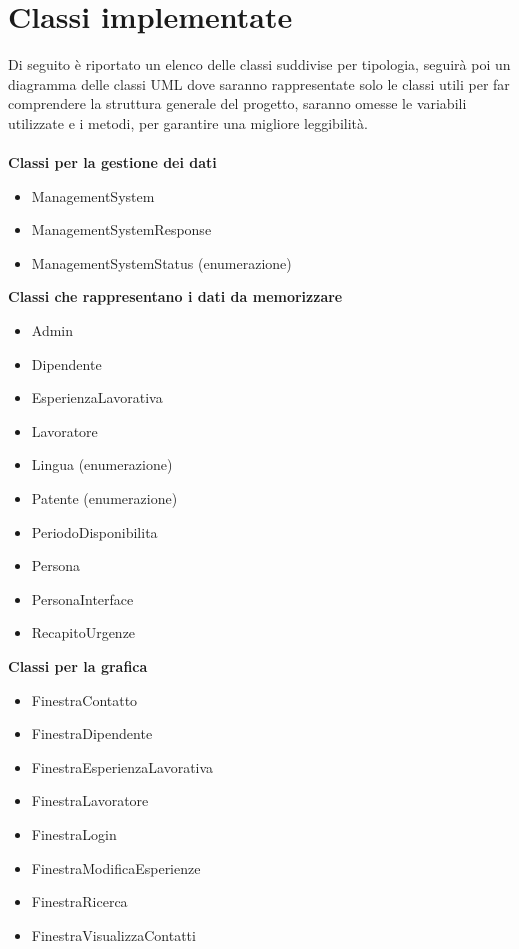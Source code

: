 \documentclass[ 4paper,11pt,openany]{book}
\begin{document}
\section{Classi implementate}
Di seguito è riportato un elenco delle classi suddivise per tipologia, seguirà poi un diagramma delle classi UML dove saranno rappresentate solo le classi utili per far comprendere la struttura generale del progetto, saranno omesse le variabili utilizzate e i metodi, per garantire una migliore leggibilità.\\\\
\textbf{Classi per la gestione dei dati}
\begin{itemize}
\item ManagementSystem
\item ManagementSystemResponse
\item ManagementSystemStatus (enumerazione)
\end{itemize}
\textbf{Classi che rappresentano i dati da memorizzare}
\begin{itemize}
\item Admin
\item Dipendente
\item EsperienzaLavorativa
\item Lavoratore
\item Lingua (enumerazione)
\item Patente (enumerazione)
\item PeriodoDisponibilita
\item Persona
\item PersonaInterface
\item RecapitoUrgenze
\end{itemize}
\textbf{Classi per la grafica}
\begin{itemize}
\item FinestraContatto
\item FinestraDipendente
\item FinestraEsperienzaLavorativa
\item FinestraLavoratore
\item FinestraLogin 
\item FinestraModificaEsperienze
\item FinestraRicerca
\item FinestraVisualizzaContatti
\end{itemize}
\end{document}
